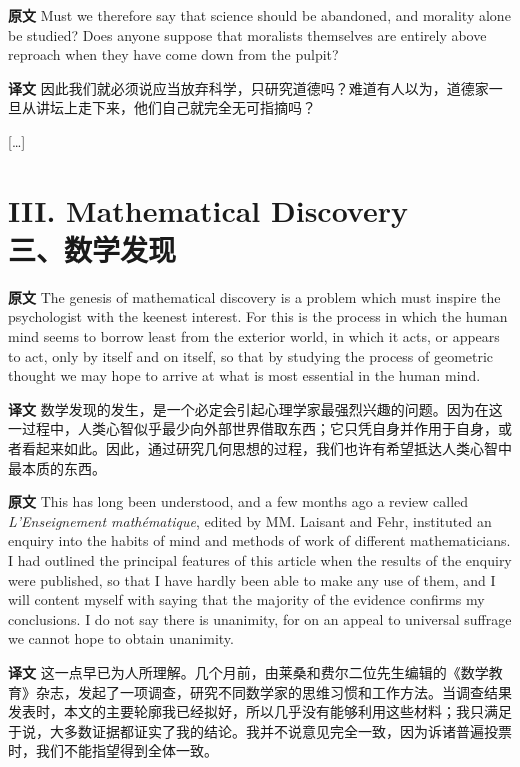 \documentclass[UTF8]{ctexart}
\newenvironment{english}{\par\small\noindent\textbf{原文}\quad\ignorespaces}{\par}
\newenvironment{zhtranslation}{\par\noindent\textbf{译文}\quad\ignorespaces}{\par\vspace{0.35em}}
\begin{document}
\begin{english}
Must we therefore say that science should be abandoned, and morality alone be studied? Does anyone suppose that moralists themselves are entirely above reproach when they have come down from the pulpit?
\end{english}
\begin{zhtranslation}
因此我们就必须说应当放弃科学，只研究道德吗？难道有人以为，道德家一旦从讲坛上走下来，他们自己就完全无可指摘吗？
\end{zhtranslation}

\begin{center}
[\dots]
\end{center}

\section*{III. Mathematical Discovery\\三、数学发现}

\begin{english}
The genesis of mathematical discovery is a problem which must inspire the psychologist with the keenest interest. For this is the process in which the human mind seems to borrow least from the exterior world, in which it acts, or appears to act, only by itself and on itself, so that by studying the process of geometric thought we may hope to arrive at what is most essential in the human mind.
\end{english}
\begin{zhtranslation}
数学发现的发生，是一个必定会引起心理学家最强烈兴趣的问题。因为在这一过程中，人类心智似乎最少向外部世界借取东西；它只凭自身并作用于自身，或者看起来如此。因此，通过研究几何思想的过程，我们也许有希望抵达人类心智中最本质的东西。\end{zhtranslation}

\begin{english}
This has long been understood, and a few months ago a review called \emph{L'Enseignement mathématique}, edited by MM. Laisant and Fehr, instituted an enquiry into the habits of mind and methods of work of different mathematicians. I had outlined the principal features of this article when the results of the enquiry were published, so that I have hardly been able to make any use of them, and I will content myself with saying that the majority of the evidence confirms my conclusions. I do not say there is unanimity, for on an appeal to universal suffrage we cannot hope to obtain unanimity.
\end{english}
\begin{zhtranslation}
这一点早已为人所理解。几个月前，由莱桑和费尔二位先生编辑的《数学教育》杂志，发起了一项调查，研究不同数学家的思维习惯和工作方法。当调查结果发表时，本文的主要轮廓我已经拟好，所以几乎没有能够利用这些材料；我只满足于说，大多数证据都证实了我的结论。我并不说意见完全一致，因为诉诸普遍投票时，我们不能指望得到全体一致。\end{zhtranslation}
\end{document}
